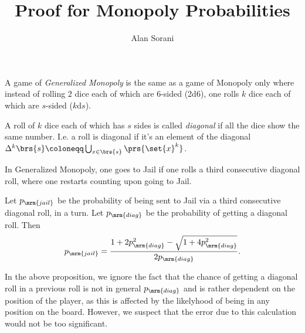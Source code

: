 \documentclass[10pt]{article}
\author{Alan Sorani}
\title{Proof for Monopoly Probabilities}
\begin{document}
\maketitle

\begin{definition}
A game of \emph{Generalized Monopoly} is the same as a game of Monopoly only where instead of rolling $2$ dice each of which are $6$-sided (2d6), one rolls $k$ dice each of which are $s$-sided ($k$d$s$).
\end{definition}

\begin{definition}
A roll of $k$ dice each of which has $s$ sides is called \emph{diagonal} if all the dice show the same number. I.e. a roll is diagonal if it's an element of the diagonal $\Delta^k \brs{s} \coloneqq \bigcup_{x \in \brs{s}} \prs{\set{x}^k}$.
\end{definition}

\begin{axiom}
In Generalized Monopoly, one goes to Jail if one rolls a third consecutive diagonal roll, where one restarts counting upon going to Jail.
\end{axiom}

\begin{proposition}
Let $p_{\mrm{jail}}$ be the probability of being sent to Jail via a third consecutive diagonal roll, in a turn. Let $p_{\mrm{diag}}$ be the probability of getting a diagonal roll. Then
\begin{align*}
p_{\mrm{jail}} = \frac{1 + 2 p_{\mrm{diag}}^2 - \sqrt{1 + 4 p_{\mrm{diag}}^2}}{2 p_{\mrm{diag}}} \text{.}
\end{align*}
\end{proposition}

\begin{note}
In the above proposition, we ignore the fact that the chance of getting a diagonal roll in a previous roll is not in general $p_{\mrm{diag}}$ and is rather dependent on the position of the player, as this is affected by the likelyhood of being in any position on the board. However, we suspect that the error due to this calculation would not be too significant.
\end{note}
\end{document}
